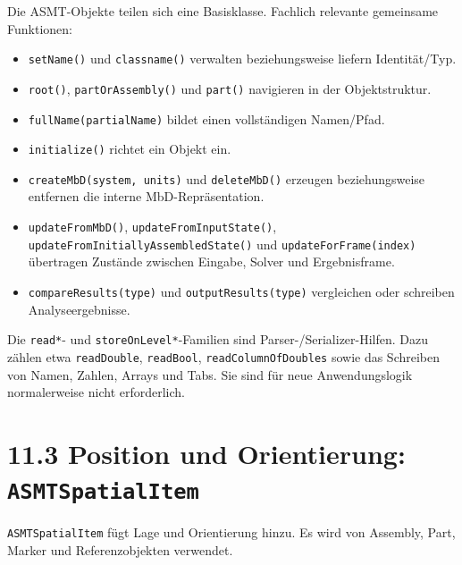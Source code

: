 \documentclass[
  12pt
]{book}
\providecommand{\tightlist}{%
  \setlength{\itemsep}{0pt}\setlength{\parskip}{0pt}}
\begin{document}
Die ASMT-Objekte teilen sich eine Basisklasse. Fachlich relevante
gemeinsame Funktionen:

\begin{itemize}
\tightlist
\item
  \texttt{setName()} und \texttt{classname()} verwalten beziehungsweise
  liefern Identität/Typ.
\item
  \texttt{root()}, \texttt{partOrAssembly()} und \texttt{part()}
  navigieren in der Objektstruktur.
\item
  \texttt{fullName(partialName)} bildet einen vollständigen Namen/Pfad.
\item
  \texttt{initialize()} richtet ein Objekt ein.
\item
  \texttt{createMbD(system,\ units)} und \texttt{deleteMbD()} erzeugen
  beziehungsweise entfernen die interne MbD-Repräsentation.
\item
  \texttt{updateFromMbD()}, \texttt{updateFromInputState()},
  \texttt{updateFromInitiallyAssembledState()} und
  \texttt{updateForFrame(index)} übertragen Zustände zwischen Eingabe,
  Solver und Ergebnisframe.
\item
  \texttt{compareResults(type)} und \texttt{outputResults(type)}
  vergleichen oder schreiben Analyseergebnisse.
\end{itemize}

Die \texttt{read*}- und \texttt{storeOnLevel*}-Familien sind
Parser-/Serializer-Hilfen. Dazu zählen etwa \texttt{readDouble},
\texttt{readBool}, \texttt{readColumnOfDoubles} sowie das Schreiben von
Namen, Zahlen, Arrays und Tabs. Sie sind für neue Anwendungslogik
normalerweise nicht erforderlich.

\hypertarget{position-und-orientierung-asmtspatialitem}{%
\section{\texorpdfstring{{11.3} Position und Orientierung:
\texttt{ASMTSpatialItem}}{11.3 Position und Orientierung: ASMTSpatialItem}}\label{position-und-orientierung-asmtspatialitem}}

\texttt{ASMTSpatialItem} fügt Lage und Orientierung hinzu. Es wird von
Assembly, Part, Marker und Referenzobjekten verwendet.
\end{document}
